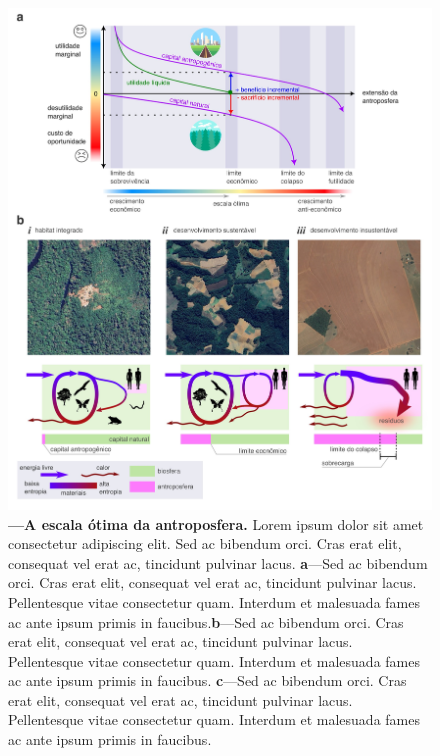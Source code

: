 \documentclass[./main.tex]{subfiles}
\begin{document}
\begin{figure}[t!] 
\centering				
\includegraphics[width=0.98\linewidth]{figs/fig_optscale.jpg}		
\caption[A escala ótima da Antroposfera]
{\textbf{---\;A escala ótima da antroposfera.}
    Lorem ipsum dolor sit amet consectetur adipiscing elit. Sed ac bibendum orci. Cras erat elit, consequat vel erat ac, tincidunt pulvinar lacus. \;\textbf{a}\;---\;Sed ac bibendum orci. Cras erat elit, consequat vel erat ac, tincidunt pulvinar lacus. Pellentesque vitae consectetur quam. Interdum et malesuada fames ac ante ipsum primis in faucibus.\;\textbf{b}\;---\;Sed ac bibendum orci. Cras erat elit, consequat vel erat ac, tincidunt pulvinar lacus. Pellentesque vitae consectetur quam. Interdum et malesuada fames ac ante ipsum primis in faucibus. \;\textbf{c}\;---\;Sed ac bibendum orci. Cras erat elit, consequat vel erat ac, tincidunt pulvinar lacus. Pellentesque vitae consectetur quam. Interdum et malesuada fames ac ante ipsum primis in faucibus.
}
\label{fig:eco:escaleopt} 		
\end{figure}
\end{document}
